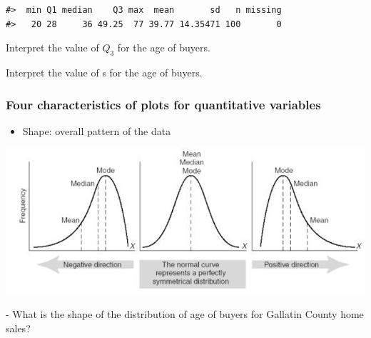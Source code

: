 \documentclass[
]{report}
\newenvironment{Shaded}{\begin{snugshade}}{\end{snugshade}}
\newcommand{\FunctionTok}[1]{\textcolor[rgb]{0.13,0.29,0.53}{\textbf{#1}}}
\newcommand{\NormalTok}[1]{#1}
\newcommand{\SpecialCharTok}[1]{\textcolor[rgb]{0.81,0.36,0.00}{\textbf{#1}}}
\providecommand{\tightlist}{%
  \setlength{\itemsep}{0pt}\setlength{\parskip}{0pt}}
\newcommand{\rgi}{\hspace{24pt}}  %
\begin{document}
\begin{Shaded}
\end{Shaded}

\begin{verbatim}
#>  min Q1 median    Q3 max  mean       sd   n missing
#>   20 28     36 49.25  77 39.77 14.35471 100       0
\end{verbatim}

Interpret the value of \(Q_3\) for the age of buyers.

\vspace{0.5in}

Interpret the value of s for the age of buyers.

\vspace{0.5in}

\newpage

\subsubsection*{Four characteristics of plots for quantitative variables}\label{four-characteristics-of-plots-for-quantitative-variables}

\begin{itemize}
\tightlist
\item
  Shape: overall pattern of the data
\end{itemize}

\begin{center}\includegraphics[width=0.8\linewidth]{images/shape} \end{center}

\rgi \rgi - What is the shape of the distribution of age of buyers for Gallatin County home sales?

\vspace{0.3in}
\end{document}
